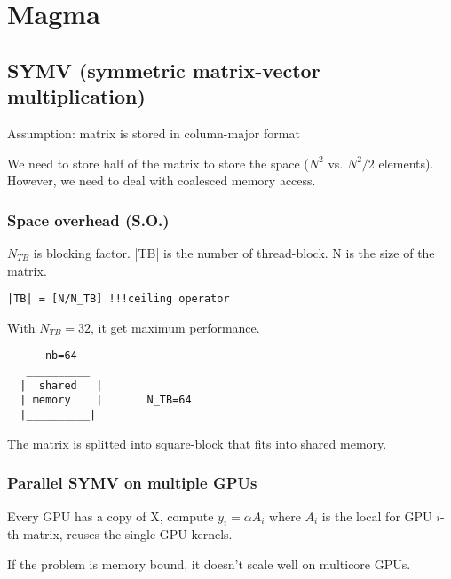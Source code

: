 \chapter{Magma}
\label{chap:magma}

\section{SYMV (symmetric matrix-vector multiplication)}

Assumption: matrix is stored in column-major format

We need to store half of the matrix to store the space ($N^2$ vs. $N^2/2$
elements). However, we need to deal with coalesced memory access. 

\subsection{Space overhead (S.O.)}

$N_{TB}$ is blocking factor. |TB| is the number of thread-block. N is the size
of the matrix. 
\begin{verbatim}
|TB| = [N/N_TB] !!!ceiling operator
\end{verbatim}

With $N_{TB}=32$, it get maximum performance. 
\begin{verbatim}
      nb=64
   __________
  |  shared   |        
  | memory    |       N_TB=64
  |__________|
\end{verbatim}
The matrix is splitted into square-block that fits into shared memory. 

\subsection{Parallel SYMV on multiple GPUs}

Every GPU has a copy of X, compute $y_i=\alpha A_i$ where $A_i$ is the local for
GPU $i$-th matrix, reuses the single GPU kernels. 

If the problem is memory bound, it doesn't scale well on multicore GPUs. 
